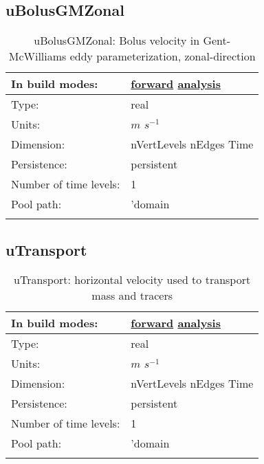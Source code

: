 \subsection[uBolusGMZonal]{uBolusGMZonal}
\label{subsec:var_sec_diagnostics_uBolusGMZonal}
\begin{center}
\begin{longtable}{| p{2.0in} | p{4.0in} |}
        \hline 
        In build modes: & \hyperref[subsec:forward_var_tab_diagnostics]{forward} \hyperref[subsec:analysis_var_tab_diagnostics]{analysis} \\
        \hline 
        Type: & real \\
        \hline 
        Units: & $m$ $s^{-1}$ \\
        \hline 
        Dimension: & nVertLevels nEdges Time \\
        \hline 
        Persistence: & persistent \\
        \hline 
        Number of time levels: & 1 \\
        \hline 
            Pool path: & 'domain %
 \\
		 \hline 
    \caption{uBolusGMZonal: Bolus velocity in Gent-McWilliams eddy parameterization, zonal-direction}
\end{longtable}
\end{center}
\subsection[uTransport]{uTransport}
\label{subsec:var_sec_diagnostics_uTransport}
\begin{center}
\begin{longtable}{| p{2.0in} | p{4.0in} |}
        \hline 
        In build modes: & \hyperref[subsec:forward_var_tab_diagnostics]{forward} \hyperref[subsec:analysis_var_tab_diagnostics]{analysis} \\
        \hline 
        Type: & real \\
        \hline 
        Units: & $m$ $s^{-1}$ \\
        \hline 
        Dimension: & nVertLevels nEdges Time \\
        \hline 
        Persistence: & persistent \\
        \hline 
        Number of time levels: & 1 \\
        \hline 
            Pool path: & 'domain %
 \\
		 \hline 
    \caption{uTransport: horizontal velocity used to transport mass and tracers}
\end{longtable}
\end{center}
